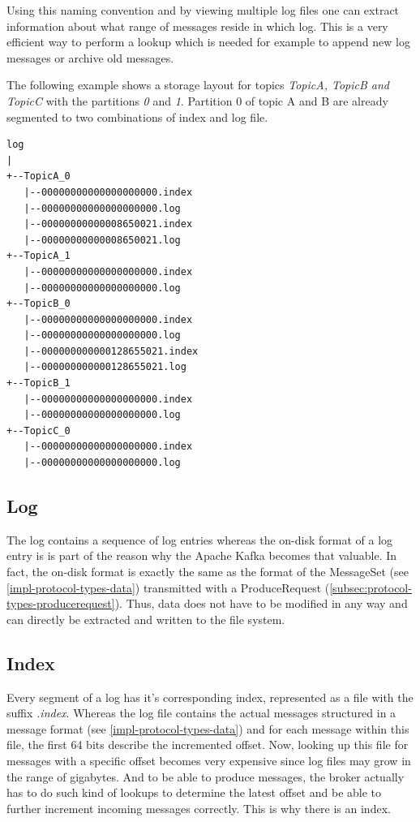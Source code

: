 Using this naming convention and by
viewing multiple log files one can extract information about what range of
messages reside in which log. This is a very efficient way to perform a lookup
which is needed for example to append new log messages or archive old messages.

The following example shows a storage layout for topics \textit{TopicA, TopicB and TopicC} with the
partitions \textit{0} and \textit{1}. Partition 0 of topic A and B are already
segmented to two combinations of index and log file. 
\begin{verbatim}
log
|
+--TopicA_0
   |--00000000000000000000.index
   |--00000000000000000000.log
   |--00000000000008650021.index
   |--00000000000008650021.log
+--TopicA_1
   |--00000000000000000000.index
   |--00000000000000000000.log
+--TopicB_0
   |--00000000000000000000.index
   |--00000000000000000000.log
   |--000000000000128655021.index
   |--000000000000128655021.log
+--TopicB_1
   |--00000000000000000000.index
   |--00000000000000000000.log
+--TopicC_0
   |--00000000000000000000.index
   |--00000000000000000000.log
\end{verbatim}

\newpage
\subsection{Log}

The log contains a sequence of log entries whereas the on-disk format of a log
entry is is part of the reason why the Apache Kafka becomes that valuable. In
fact, the on-disk format is exactly the same as the format of the MessageSet
(see \ref{impl-protocol-types-data}) transmitted with a ProduceRequest
(\ref{subsec:protocol-types-producerequest}). Thus, data does not have to be
modified in any way and can directly be extracted and written to the file
system.

\subsection{Index}
Every segment of a log has it's corresponding index, represented as a file with
the suffix \textit{.index}. Whereas the log file contains the actual messages structured in a
message format (see \ref{impl-protocol-types-data}) and for each message within
this file, the first 64 bits describe the incremented offset. Now, looking up
this file for messages with a specific offset becomes very expensive since log
files may grow in the range of gigabytes. And to be able to produce messages,
the broker actually has to do such kind of lookups to determine the latest
offset and be able to further increment incoming messages correctly. This is why
there is an index.


